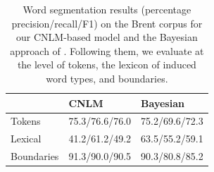 

\begin{table}[t]
  \begin{center}
    \begin{tabular}{l|ll}
	    &	     CNLM & Bayesian \\ \hline %
	    Tokens & 75.3/76.6/76.0 & 75.2/69.6/72.3 \\
	    Lexical & 41.2/61.2/49.2 &63.5/55.2/59.1  \\
	    Boundaries & 91.3/90.0/90.5 & 90.3/80.8/85.2 \\
    \end{tabular}
  \end{center}
	\caption{\label{tab:segmentation-results-brent} Word segmentation results (percentage precision/recall/F1)  on the Brent corpus for our CNLM-based model and the Bayesian approach of . Following them, we evaluate at the level of tokens, the lexicon of induced word types, and boundaries.}
\end{table}




